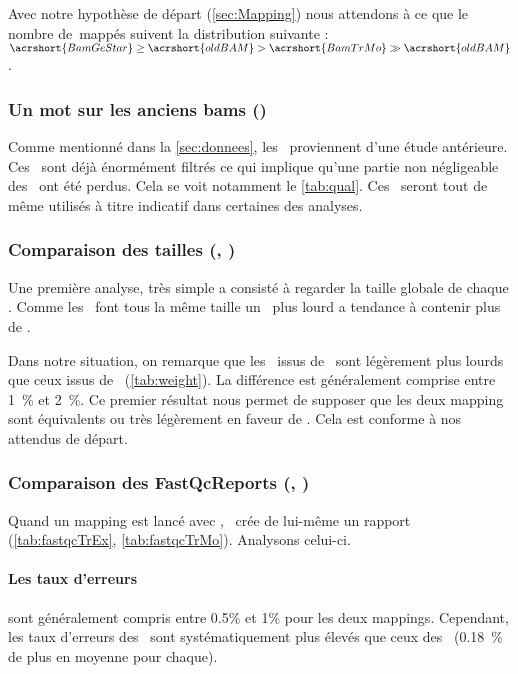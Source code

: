 \documentclass[../main]{subfiles} %
\begin{document}
Avec notre hypothèse de départ (\cref{sec:Mapping}) nous attendons à ce que le nombre de \reads\,mappés suivent la distribution suivante : $\acrshort{BamGeStar} \geq \acrshort{oldBAM} > \acrshort{BamTrMo} \gg \acrshort{oldBAM}$.

\subsubsection{Un mot sur les anciens bams (\OldBam)}
\label{sec:oldBam}
Comme mentionné dans la \cref{sec:donnees}, les \OldBam proviennent d'une étude antérieure. Ces \bam sont déjà énormément filtrés ce qui implique qu'une partie non négligeable des \reads ont été perdus. Cela se voit notamment le \cref{tab:qual}. Ces \bam seront tout de même utilisés à titre indicatif dans certaines des analyses.


\subsubsection{Comparaison des tailles (\BamTrEx, \BamTrMo)}
Une première analyse, très simple a consisté à regarder la taille globale de chaque \bam. Comme les \reads font tous la même taille un \bam plus lourd a tendance à contenir plus de \reads.






Dans notre situation, on remarque que les \bam issus de \TrMo sont légèrement plus lourds que ceux issus de \TrEx (\cref{tab:weight}). La différence est généralement comprise entre 1 \% et 2 \%. Ce premier résultat nous permet de supposer que les deux \gls{mapping} sont équivalents ou très légèrement en faveur de \TrEx. Cela est conforme à nos attendus de départ.


\subsubsection{Comparaison des FastQcReports (\BamTrEx, \BamTrMo)}
\label{sec:fastqc}
Quand un \gls{mapping} est lancé avec \GeCKO, \GeCKO crée de lui-même un rapport \fastqc (\cref{tab:fastqcTrEx}, \cref{tab:fastqcTrMo}). Analysons celui-ci.







\paragraph{Les taux d'erreurs} sont généralement compris entre 0.5\% et 1\% pour les deux \glspl{mapping}. Cependant, les taux d'erreurs des \BamTrMo sont systématiquement plus élevés que ceux des \BamTrEx (0.18 \% de plus en moyenne pour chaque). 
\end{document}
